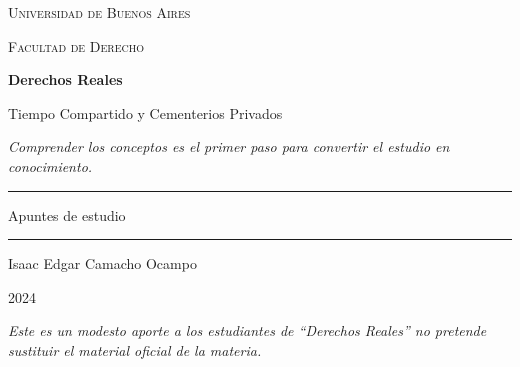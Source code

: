 \documentclass[12pt,oneside]{book}
\newcommand{\universidad}{Universidad de Buenos Aires}
\newcommand{\facultad}{Facultad de Derecho}
\newcommand{\materia}{Derechos Reales}
\newcommand{\autor}{Isaac Edgar Camacho Ocampo}
\newcommand{\anio}{2024}
\begin{document}
\begin{titlepage}

\thispagestyle{empty}

\begin{center}

\vspace*{1cm}

{\large \textsc{\universidad}}

\vspace{0.2cm}

{\large \textsc{\facultad}}

\vspace{3cm}

{\Huge \textbf{\materia}}

\vspace{1cm}

{\LARGE Tiempo Compartido y Cementerios Privados}

\vspace{0.8cm}

\textit{Comprender los conceptos es el primer paso para convertir el estudio en conocimiento.}

\vspace{1.2cm}

\rule{0.70\textwidth}{0.5pt}

\vspace{0.5cm}

{\large Apuntes de estudio}

\vspace{0.5cm}

\rule{0.70\textwidth}{0.5pt}

\vfill

{\large \autor}

\vspace{0.3cm}

{\large \anio}

\end{center}

\vfill

\begin{flushleft}
\textit{Este es un modesto aporte a los estudiantes de ``Derechos Reales'' no pretende sustituir el material oficial de la materia.}
\end{flushleft}

\end{titlepage}

\tableofcontents
\end{document}
